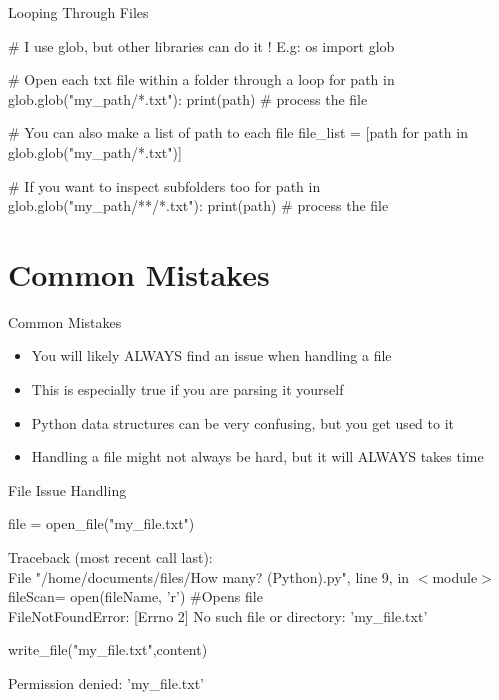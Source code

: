\documentclass[serif, aspectratio=169]{beamer}
\begin{document}
\begin{frame}[fragile]{Looping Through Files}
    \begin{pythoncode}
    # I use glob, but other libraries can do it ! E.g: os
    import glob

    # Open each txt file within a folder through a loop
    for path in glob.glob("my_path/*.txt"):
        print(path)
        # process the file

    # You can also make a list of path to each file
    file_list = [path for path in glob.glob("my_path/*.txt")]

    # If you want to inspect subfolders too
    for path in glob.glob("my_path/**/*.txt"):
        print(path)
        # process the file
    \end{pythoncode}
\end{frame}

\section{Common Mistakes}

\begin{frame}{Common Mistakes}
    \begin{block}{}
        \begin{itemize}
            \item You will likely ALWAYS find an issue when handling a file
            \item This is especially true if you are parsing it yourself
            \item Python data structures can be very confusing, but you get used to it
            \item Handling a file might not always be hard, but it will ALWAYS takes time
        \end{itemize}
    \end{block}
\end{frame}

\begin{frame}[fragile]{File Issue Handling}
    \begin{pythoncode}
    file = open_file("my_file.txt")
    \end{pythoncode}
    \begin{CLI}
        Traceback (most recent call last): \\
    File "/home/documents/files/How many? (Python).py", line 9, in $<$module$>$ \\
        fileScan= open(fileName, 'r')  \#Opens file \\
    FileNotFoundError: [Errno 2] No such file or directory: 'my\_file.txt' \\
    \end{CLI}
    \vfill
    \begin{pythoncode}
    write_file("my_file.txt",content)
    \end{pythoncode}
    \begin{CLI}
        [Errno 13] Permission denied: 'my\_file.txt' \\
    \end{CLI}
\end{frame}
\end{document}
